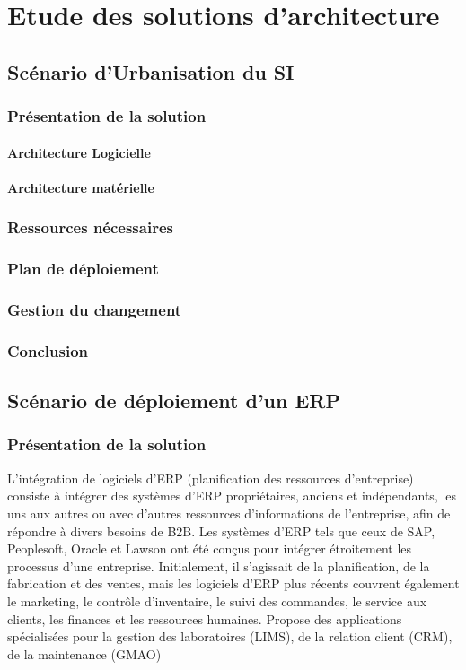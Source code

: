 \section{Etude des solutions d'architecture}

\subsection{Scénario d'Urbanisation du SI}

\subsubsection{Présentation de la solution}
\paragraph{Architecture Logicielle}

\paragraph{Architecture matérielle}

\subsubsection{Ressources nécessaires}

\subsubsection{Plan de déploiement}

\subsubsection{Gestion du changement}

\subsubsection{Conclusion}

\subsection{Scénario de déploiement d'un ERP}

\subsubsection{Présentation de la solution}
L’intégration de logiciels d’ERP (planification des ressources d’entreprise) consiste à intégrer des systèmes d’ERP propriétaires, anciens et indépendants, les uns aux autres ou avec d’autres ressources d’informations de l’entreprise, afin de répondre à divers besoins de B2B. Les systèmes d’ERP tels que ceux de SAP, Peoplesoft, Oracle et Lawson ont été conçus pour intégrer étroitement les processus d’une entreprise. Initialement, il s’agissait de la planification, de la fabrication et des ventes, mais les logiciels d’ERP plus récents couvrent également le marketing, le contrôle d’inventaire, le suivi des commandes, le service aux clients, les finances et les ressources humaines.
Propose des applications spécialisées pour la gestion des laboratoires (LIMS), de la relation client (CRM), de la maintenance (GMAO)
